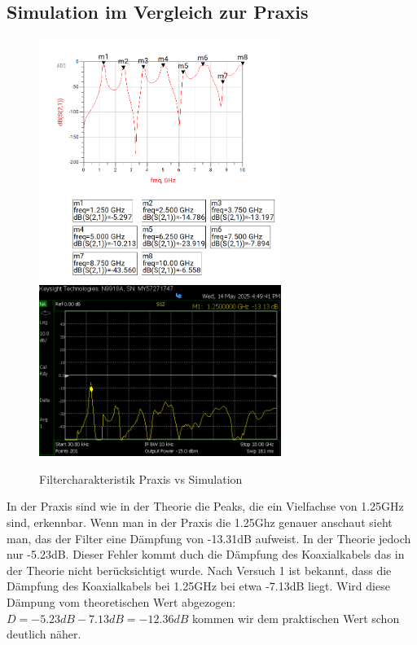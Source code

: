 \subsection{Simulation im Vergleich zur Praxis}
\begin{figure}[H]
    \includegraphics[width=0.7\textwidth]{Pictures/simulationmitmarkern32.8.png}
    \includegraphics[width=0.7\textwidth]{Pictures/S12neuCooleGrupp.png}
    \centering
    \caption{Filtercharakteristik Praxis vs Simulation}
\end{figure}
In der Praxis sind wie in der Theorie die Peaks, die ein Vielfachse von 1.25GHz sind, erkennbar.
Wenn man in der Praxis die 1.25Ghz genauer anschaut sieht man, das der Filter eine Dämpfung von -13.31dB
aufweist. In der Theorie jedoch nur -5.23dB. Dieser Fehler kommt duch die Dämpfung des Koaxialkabels
das in der Theorie nicht berücksichtigt wurde.
Nach Versuch 1 ist bekannt, dass die Dämpfung des Koaxialkabels bei 1.25GHz bei etwa -7.13dB liegt.
Wird diese Dämpung vom theoretischen Wert abgezogen: $D=-5.23dB-7.13dB=-12.36dB$ 
kommen wir dem praktischen Wert schon deutlich näher.
     




